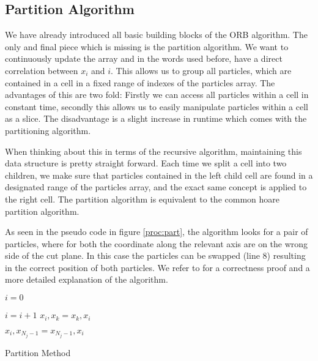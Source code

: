 \documentclass[]{article}
\begin{document}
\subsection{Partition Algorithm}

We have already introduced all basic building blocks of the ORB algorithm. The only and final piece which is missing is the partition algorithm. We want to continuously update the array and in the words used before, have a direct correlation between $x_i$ and $i$. This allows us to group all particles, which are contained in a cell in a fixed range of indexes of the particles array. The advantages of this are two fold: Firstly we can access all particles within a cell in constant time, secondly this allows us to easily manipulate particles within a cell as a slice. The disadvantage is a slight increase in runtime which comes with the partitioning algorithm.

When thinking about this in terms of the recursive algorithm, maintaining this data structure is pretty straight forward. Each time we split a cell into two children, we make sure that particles contained in the left child cell are found in a designated range of the particles array, and the exact same concept is applied to the right cell. The partition algorithm is equivalent to the common hoare partition algorithm\cite{algorithms}. 

As seen in the pseudo code in figure \ref{proc:part}, the algorithm looks for a pair of particles, where for both the coordinate along the relevant axis are  on the wrong side of the cut plane. In this case the particles can be swapped (line 8) resulting in the correct position of both particles. We refer to \cite{algorithms} for a correctness proof and a more detailed explanation of the algorithm. 

\algnewcommand{}

\begin{algorithm}[H]
	\begin{algorithmic}[1]
		\State $i = 0$
		
			\State $i = i + 1$
		\EndWhile
		\State $x_{i}, x_{k} = x_{k}, x_{i}$
		\EndIf
		\EndFor
		
		\State $ x_{i}, x_{N_j-1} = x_{N_j-1}, x_{i}$
		\EndProcedure
	\end{algorithmic}
\caption{Partition Method}
\label{proc:part}
\end{algorithm}
\end{document}
